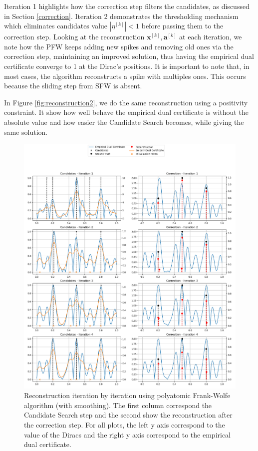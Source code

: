 \documentclass[a4paper,12pt,oneside]{report}
\theoremstyle{named}
\begin{document}
Iteration 1 highlights how the correction step filters the candidates, as discussed in Section \ref{correction}. Iteration 2 demonstrates the thresholding mechanism which eliminates candidates value $|\eta^{[k]}| < 1$ before passing them to the correction step. Looking at the reconstruction $\mathbf{x}^{[k]}, \mathbf{a}^{[k]}$ at each iteration, we note how the PFW keeps adding new spikes and removing old ones via the correction step, maintaining an improved solution, thus having the empirical dual certificate converge to 1 at the Dirac's positions. It is important to note that, in most cases, the algorithm reconstructs a spike with multiples ones. This occurs because the sliding step from SFW is absent.

In Figure \ref{fig:reconstruction2}, we do the same reconstruction using a positivity
constraint. It show how well behave the empirical dual certificate is without the absolute value and how easier the Candidate Search becomes, while giving the same solution.

\begin{figure}[t!]
\centering
\includegraphics[width=1\linewidth]{reconstruction.png}
\caption{Reconstruction iteration by iteration using polyatomic Frank-Wolfe algorithm (with smoothing). The first column correspond the Candidate Search step and the second show the reconstruction after the correction step. For all plots, the left y axis correspond to the value of the Diracs and the right y axis correspond to the empirical dual certificate.}
\label{fig:reconstruction}
\end{figure}
\end{document}
